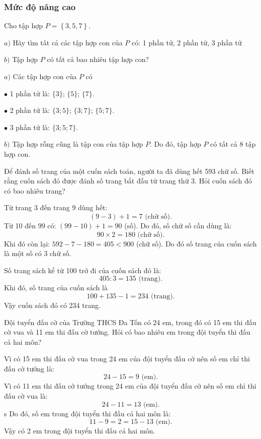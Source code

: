 \subsubsection*{Mức độ nâng cao}
\vspace*{-10pt}
\begin{bt}
	Cho tập hợp $P=\left\{ 3,5,7 \right\}$. 
	
	$a)$ Hãy tìm tất cả các tập hợp con của $P$ có: 1 phần tử, 2 phần tử, 3 phần tử
	
	$b)$ Tập hợp $P$ có tất cả bao nhiêu tập hợp con?
	\begin{loigiaichuong1}
		$a)$	Các tập hợp con của $P$ có
		
		$\bullet$	1 phần tử là: $\{3\}$; $\{5\}$; $\{7\}$.
		
		$\bullet$	2 phần tử là: $\{3; 5\}$; $\{3; 7\}$; $\{5; 7\}$.
		
		$\bullet$	3 phần tử là: $\{3; 5; 7\}$.
		
		$b)$	Tập hợp rỗng cũng là tập con của tập hợp $P$. Do đó, tập hợp $P$ có tất cả 8
		tập hợp con.
	\end{loigiaichuong1}
\end{bt}
\begin{bt}
	Để đánh số trang của một cuốn sách toán, người ta đã dùng hết 593 chữ số. Biết rằng cuốn sách đó được đánh số trang bắt đầu từ trang thứ 3. Hỏi cuốn sách đó có bao nhiêu trang?
	\begin{loigiaichuong1}
		Từ trang 3 đến trang 9 dùng hết:
		\[(9 - 3) + 1 = 7 \text{ (chữ số)}.\]
		Từ 10 đến 99 có: $(99 - 10) + 1 = 90$ (số). Do đó, số chữ số cần dùng là:
		\[90 \times 2 = 180 \text{ (chữ số)}.\]
		Khi đó còn lại: $592 - 7 - 180 = 405 < 900$ (chữ số). Do đó số trang của cuốn sách là một số có 3 chữ số.
		
		Số trang sách kể từ 100 trở đi của cuốn sách đó là:
		\[405 : 3 = 135 \text{ (trang)}.\]
		Khi đó, số trang của cuốn sách là
		\[100 + 135 - 1 = 234 \text{ (trang)}.\]
		Vậy cuốn sách đó có 234 trang.
	\end{loigiaichuong1}
\end{bt}
\begin{bt}
	Đội tuyển đấu cờ của Trường THCS Đa Tốn có 24 em, trong đó có 15 em thi đấu cờ vua và 11 em thi đấu cờ tướng. Hỏi có bao nhiêu em trong đội tuyển thi đấu cả hai môn?
	\begin{loigiaichuong1}
		Vì có 15 em thi đấu cờ vua trong 24 em của đội tuyển đấu cờ nên số em chỉ thi đấu cờ tướng là:
		\[24 - 15 = 9 \text{ (em)}.\]
		Vì có 11 em thi đấu cờ tướng trong 24 em của đội tuyển đấu cờ nên số em chỉ thi đấu cờ vua là:
		\[24 - 11 = 13 \text{ (em)}.\]s
		Do đó, số em trong đội tuyển thi đấu cả hai môn là:
		\[11 - 9 = 2 = 15 - 13 \text{ (em)}.\]
		Vậy có 2 em trong đội tuyển thi đấu cả hai môn.
	\end{loigiaichuong1}
\end{bt}
